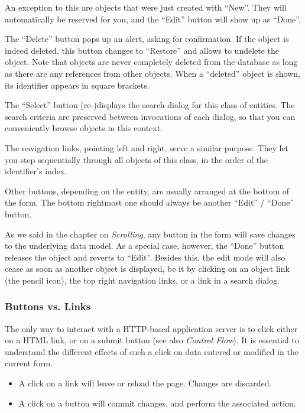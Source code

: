 An exception to this are objects that were just created with ``New''. They
will automatically be reserved for you, and the ``Edit'' button will show
up as ``Done''.

The ``Delete'' button pops up an alert, asking for confirmation. If the
object is indeed deleted, this button changes to ``Restore'' and allows to
undelete the object. Note that objects are never completely deleted from
the database as long as there are any references from other objects.
When a ``deleted'' object is shown, its identifier appears in square
brackets.

The ``Select'' button (re-)displays the search dialog for this class of
entities. The search criteria are preserved between invocations of each
dialog, so that you can conveniently browse objects in this context.

The navigation links, pointing left and right, serve a similar purpose.
They let you step sequentially through all objects of this class, in the
order of the identifier's index.

Other buttons, depending on the entity, are usually arranged at the
bottom of the form. The bottom rightmost one should always be another
``Edit'' / ``Done'' button.

As we said in the chapter on \emph{Scrolling}, any button in
the form will save changes to the underlying data model. As a special
case, however, the ``Done'' button releases the object and reverts to
``Edit''. Besides this, the edit mode will also cease as soon as another
object is displayed, be it by clicking on an object link (the pencil
icon), the top right navigation links, or a link in a search dialog.


\subsubsection{ Buttons vs. Links}
\label{sec:appl-devel-buttons-vs.-links}%

The only way to interact with a HTTP-based application server is to
click either on a HTML link, or on a submit button (see also
\emph{Control Flow}). It is essential to understand the different
effects of such a click on data entered or modified in the current form.

\begin{itemize}
\item A click on a link will leave or reload the page. Changes are
   discarded.
\item A click on a button will commit changes, and perform the associated
   action.
\end{itemize}

